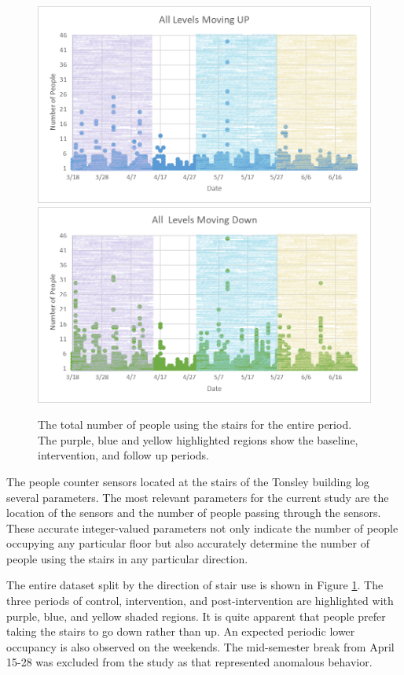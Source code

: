 \documentclass[../UNBThesis2.tex]{subfiles}
\begin{document}
\begin{figure}[!h]
    \includegraphics[width=\textwidth]{image/up.png}\hfill
    \includegraphics[width=\textwidth]{image/down.png}
    \caption{The total number of people using the stairs for the entire period. The purple, blue and yellow highlighted regions show the baseline, intervention, and follow up periods.}
    \label{updown}
\end{figure}

The people counter sensors located at the stairs of the Tonsley building log several parameters. The most relevant parameters for the current study are the location of the sensors and the number of people passing through the sensors. These accurate integer-valued parameters not only indicate the number of people occupying any particular floor but also accurately determine the number of people using the stairs in any particular direction.

The entire dataset split by the direction of stair use is shown in Figure \ref{updown}. The three periods of control, intervention, and post-intervention are highlighted with purple, blue, and yellow shaded regions. It is quite apparent that people prefer taking the stairs to go down rather than up. An expected periodic lower occupancy is also observed on the weekends. The mid-semester break from April 15-28 was excluded from the study as that represented anomalous behavior.
\end{document}
